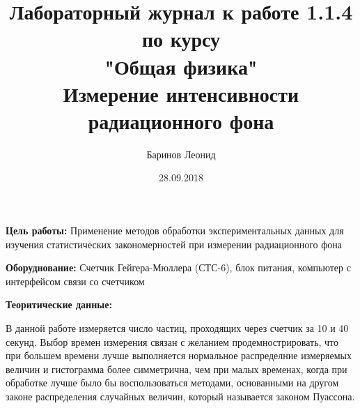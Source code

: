 \documentclass[a4paper,12pt]{article} %
\title{Лабораторный журнал к работе 1.1.4 по курсу \\ "Общая физика"  \\ 
\vspace{0.2cm}
\vspace{4.5cm}
 \LARGE{\textbf{Измерение интенсивности радиационного фона}}\vspace{5.5cm}}
\date{28.09.2018}
\author{\vspace{0.2cm}Баринов Леонид}
\begin{document}
\maketitle

\newpage

\textbf{Цель работы: } Применение методов обработки экспериментальных данных для изучения статистических закономерностей при измерении радиационного фона

\textbf{Оборуднование:} Счетчик Гейгера-Мюллера (СТС-6), блок питания, компьютер с интерфейсом связи со счетчиком

\textbf{Теоритические данные:} 

В данной работе измеряется число частиц, проходящих через счетчик за 10 и 40 секунд. Выбор времен измерения связан с желанием продемнострировать, что при большем времени лучше выполняется нормальное распределние измеряемых величин и гистограмма более симметрична, чем при малых временах, когда при обработке лучше было бы воспользоваться методами, основанными на другом законе распределения случайных величин, который называется законом Пуассона.
\end{document}
